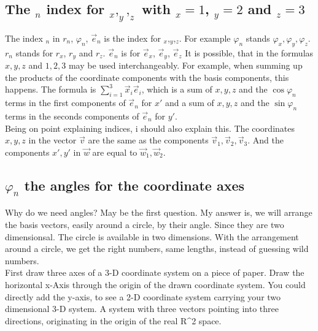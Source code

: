 \documentclass[a4paper]{article}
\begin{document}
\subsection{The $_{n}$ index for $_x,_y,_z$ with $_x=1$, $_y=2$ and $_z=3$}

The index $_{n}$ in $r_{n}$, $\varphi_{n}$, $\vec{e}_{n}$ is the index for $_x$,$_y$,$_z$. For example $\varphi_{n}$  stands $\varphi_x, \varphi_y, \varphi_z$. $r_{n}$ stands for $r_x$, $r_y$ and $r_z$. $\vec{e}_{n}$ is for $\vec{e}_x$, $\vec{e}_y$, $\vec{e}_z$ It is possible, that in the formulas $x,y,z$ and $1,2,3$ may be used interchangeably. For example, when summing up the products of the coordinate components with the basis components, this happens. The formula is $\sum_{i=1}^{3}\vec{x}_{i}\vec{e}_{i}$, which is a sum of $x,y,z$ and the $\cos \varphi_{n}$ terms in the first components of $\vec{e}_{n}$ for $x'$ and a sum of $x,y,z$ and the $\sin \varphi_{n}$ terms in the seconds components of $\vec{e}_{n}$ for $y'$.\\

Being on point explaining indices, i should also explain this. The coordinates $x,y,z$ in the vector $\vec{v}$ are the same as the components $\vec{v}_{1},\vec{v}_{2},\vec{v}_{3}$. And the components $x', y'$ in $\vec{w}$ are equal to $\vec{w}_{1}, \vec{w}_{2}$.\\

\subsection{$\varphi_{n}$ the angles for the coordinate axes}

Why do we need angles? May be the first question. My answer is, we will arrange the basis vectors,
easily around a circle, by their angle. Since they are two dimensionsal. The circle is available in two dimensions.
With the arrangement around a circle, we get the right numbers, same lengths, instead of guessing wild numbers.\\

First draw three axes of a 3-D coordinate system on a piece of paper. Draw the horizontal x-Axis through the origin of the drawn coordinate system. You could directly add the y-axis, to see a 2-D coordinate system carrying your two dimensional 3-D system. A system with three vectors pointing into three directions, originating in the origin of the real R^2 space.\\
\end{document}
